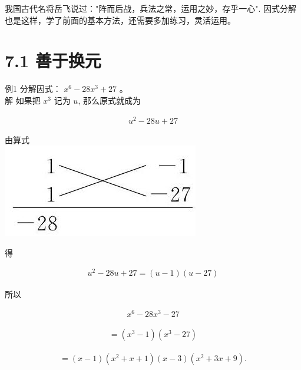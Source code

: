 \documentclass[10pt]{article}
\begin{document}
我国古代名将岳飞说过："阵而后战，兵法之常，运用之妙，存乎一心". 因式分解也是这样，学了前面的基本方法，还需要多加练习，灵活运用。

\section*{7.1 善于换元}
例1 分解因式： $x^{6}-28 x^{3}+27$ 。\\
解 如果把 $x^{3}$ 记为 $u$, 那么原式就成为

\begin{align*}
u^{2}-28 u+27
\end{align*}

由算式\\
\includegraphics[max width=\textwidth, center]{2024_10_30_bd799899fef40368a068g-047}

得

\begin{align*}
u^{2}-28 u+27=(u-1)(u-27)
\end{align*}

所以

\begin{align*}
x^{6}-28 x^{3}-27
\end{align*}

\begin{align*}
=\left(x^{3}-1\right)\left(x^{3}-27\right)
\end{align*}

\begin{align*}
=(x-1)\left(x^{2}+x+1\right)(x-3)\left(x^{2}+3 x+9\right) .
\end{align*}
\end{document}
